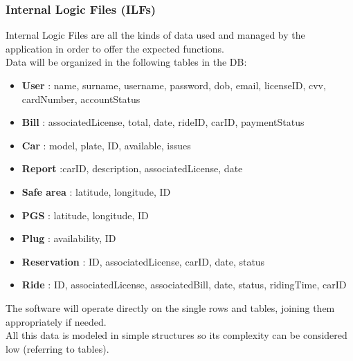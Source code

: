 \documentclass[english]{article}
\begin{document}
\subsubsection{Internal Logic Files (ILFs)}

Internal Logic Files are all the kinds of data used and managed by the application in  order to offer the expected functions.\\
Data will be organized in the following tables in the DB:

\begin{itemize}

	\item \textbf{User} : name, surname, username, password, dob, email, licenseID, cvv, cardNumber, accountStatus

	\item \textbf{Bill} : associatedLicense, total, date, rideID, carID, paymentStatus

	\item \textbf{Car} : model, plate, ID, available, issues

	\item \textbf{Report} :carID, description, associatedLicense, date

	\item \textbf{Safe area} : latitude, longitude, ID

	\item \textbf{PGS} : latitude, longitude, ID

	\item \textbf{Plug} : availability, ID

	\item \textbf{Reservation} : ID, associatedLicense, carID, date, status

	\item \textbf{Ride} : ID, associatedLicense, associatedBill, date, status, ridingTime, carID

\end{itemize}

The software will operate directly on the single rows and tables, joining them appropriately if needed.\\
All this data is modeled in simple structures so its complexity can be considered low (referring to tables).
\end{document}
